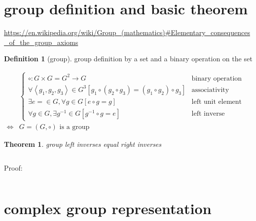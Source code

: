 \documentclass[
]{book}
\newtheorem{theorem}{Theorem}[chapter]
\theoremstyle{definition}
\newtheorem{definition}{Definition}[chapter]
\theoremstyle{definition}
\theoremstyle{definition}
\theoremstyle{definition}
\theoremstyle{remark}
\begin{document}
\hypertarget{group-definition-and-basic-theorem}{%
\section{group definition and basic theorem}\label{group-definition-and-basic-theorem}}

\url{https://en.wikipedia.org/wiki/Group_(mathematics)\#Elementary_consequences_of_the_group_axioms}

\begin{definition}[group]
\protect\hypertarget{def:unnamed-chunk-1}{}\label{def:unnamed-chunk-1}group definition by a set and a binary operation on the set
\end{definition}

\[
\begin{aligned}
 & \begin{cases}
\circ:G\times G=G^{2}\rightarrow G & \text{binary operation}\\
\forall\left\langle g_{{\scriptscriptstyle 1}},g_{{\scriptscriptstyle 2}},g_{{\scriptscriptstyle 3}}\right\rangle \in G^{3}\left[g_{{\scriptscriptstyle 1}}\circ\left(g_{{\scriptscriptstyle 2}}\circ g_{{\scriptscriptstyle 3}}\right)=\left(g_{{\scriptscriptstyle 1}}\circ g_{{\scriptscriptstyle 2}}\right)\circ g_{{\scriptscriptstyle 3}}\right] & \text{associativity}\\
\exists e=\in G,\forall g\in G\left[e\circ g=g\right] & \text{left unit element}\\
\forall g\in G,\exists g^{-1}\in G\left[g^{-1}\circ g=e\right] & \text{left inverse (element)}
\end{cases}\\
\Leftrightarrow & G=\left(G,\circ\right)\text{ is a group}
\end{aligned}
\]

\begin{theorem}
\protect\hypertarget{thm:unnamed-chunk-2}{}\label{thm:unnamed-chunk-2}group left inverses equal right inverses
\end{theorem}

\[
\
\]

Proof:

\[
\ \tag*{$\Box$}
\]

\hypertarget{complex-group-representation}{%
\section{complex group representation}\label{complex-group-representation}}
\end{document}
